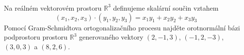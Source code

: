 \subsubsection{}
Na reálném vektorovém prostoru $\mathbb{R}^{3}$ definujeme skalární součin
vztahem 
$$\left ( x_{1},x_{2},x_{3} \right )\cdot \left ( y_{1},y_{2},y_{3}
\right )=x_{1}y_{1}+x_{2}y_{2}+x_{3}y_{3}$$
Pomocí Gram-Schmidtova ortogonalizačního procesu najděte orotnormální bázi
podprostoru prostoru $\mathbb{R}^{3}$ generovaného vektory $(2,-1,3)$,
$(-1,2,-3)$, $(3,0,3)$ a $(8,2,6)$.
